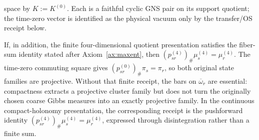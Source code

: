 \begin{proposition}
\begin{enumerate}[label=\textup{(\roman*)},leftmargin=2em]
space by \(K:=K^{(0)}\). Each is a faithful cyclic GNS pair on its support quotient; the
time-zero vector is identified as the physical vacuum only by the transfer/OS receipt below.
\end{enumerate}
If, in addition, the finite four-dimensional quotient presentation satisfies the fiber-sum
identity stated after Axiom~\ref{ax:maxent}, then
\((p_{sr}^{(4)})_\#\mu_s^{(4)}=\mu_r^{(4)}\). The time-zero commuting square gives
\((p_{sr}^{(0)})_\#\pi_s=\pi_r\), so both original state families are projective. Without that
finite receipt, the bars on
\(\overline\omega_r\) are essential: compactness extracts a projective cluster family but does
not turn the originally chosen coarse Gibbs measures into an exactly projective family. In the
continuous compact-holonomy presentation, the corresponding receipt is the pushforward identity
\((p_{sr}^{(4)})_\#\mu_s^{(4)}=\mu_r^{(4)}\), expressed through disintegration rather than a
finite sum.
\end{proposition}

